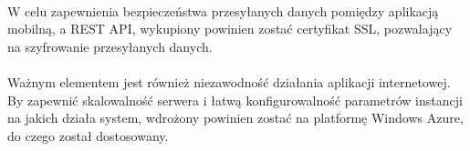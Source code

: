 \paragraph{} %
W celu zapewnienia bezpieczeństwa przesyłanych danych pomiędzy aplikacją mobilną, a REST API, wykupiony powinien zostać certyfikat SSL, pozwalający na szyfrowanie przesyłanych danych.

\paragraph{} %
 \label{par:}
 Ważnym elementem jest również niezawodność działania aplikacji internetowej. By zapewnić skalowalność serwera i łatwą konfigurowalność parametrów instancji na jakich działa system, wdrożony powinien zostać na platformę Windows Azure, do czego został dostosowany.